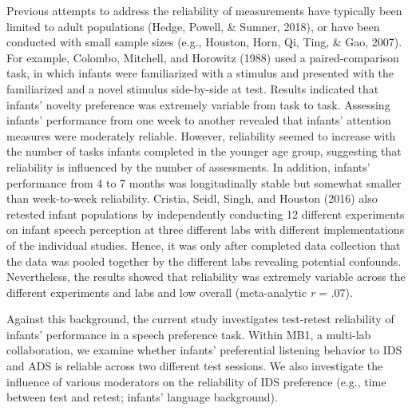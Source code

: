 \documentclass[
  man,floatsintext]{apa6}
\begin{document}
Previous attempts to address the reliability of measurements have typically been limited to adult populations (Hedge, Powell, \& Sumner, 2018), or have been conducted with small sample sizes (e.g., Houston, Horn, Qi, Ting, \& Gao, 2007).
For example, Colombo, Mitchell, and Horowitz (1988) used a paired-comparison task, in which infants were familiarized with a stimulus and presented with the familiarized and a novel stimulus side-by-side at test.
Results indicated that infants' novelty preference was extremely variable from task to task.
Assessing infants' performance from one week to another revealed that infants' attention measures were moderately reliable.
However, reliability seemed to increase with the number of tasks infants completed in the younger age group, suggesting that reliability is influenced by the number of assessments.
In addition, infants' performance from 4 to 7 months was longitudinally stable but somewhat smaller than week-to-week reliability.
Cristia, Seidl, Singh, and Houston (2016) also retested infant populations by independently conducting 12 different experiments on infant speech perception at three different labs with different implementations of the individual studies.
Hence, it was only after completed data collection that the data was pooled together by the different labs revealing potential confounds.
Nevertheless, the results showed that reliability was extremely variable across the different experiments and labs and low overall (meta-analytic \emph{r} = .07).

Against this background, the current study investigates test-retest reliability of infants' performance in a speech preference task.
Within MB1, a multi-lab collaboration, we examine whether infants' preferential listening behavior to IDS and ADS is reliable across two different test sessions.
We also investigate the influence of various moderators on the reliability of IDS preference (e.g., time between test and retest; infants' language background).
\end{document}
